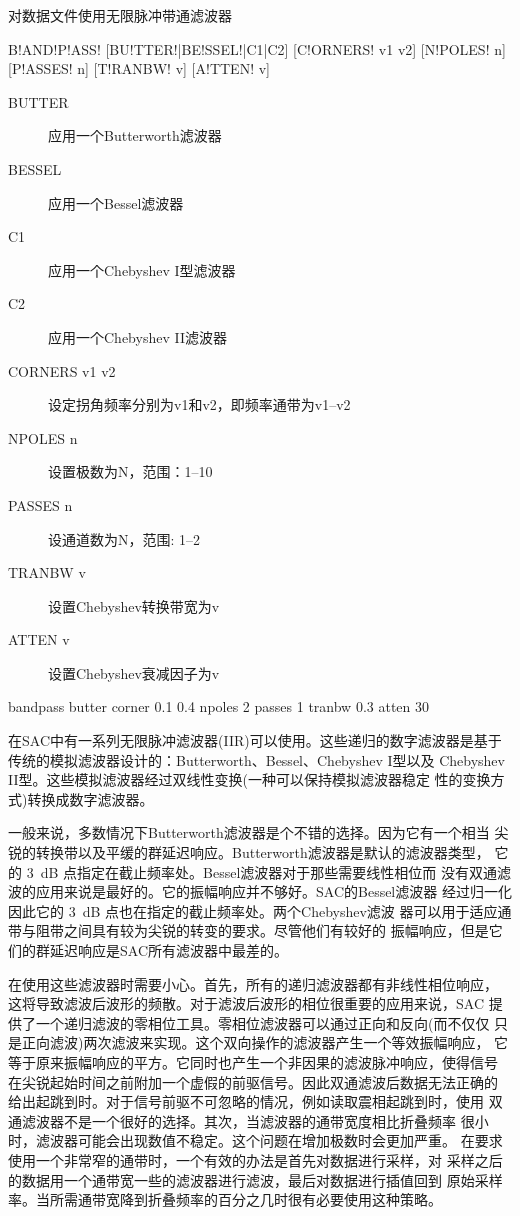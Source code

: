 \label{cmd:bandpass}

对数据文件使用无限脉冲带通滤波器

\begin{SACSTX}
B!AND!P!ASS! [BU!TTER!|BE!SSEL!|C1|C2] [C!ORNERS! v1 v2] [N!POLES! n] [P!ASSES! n]
    [T!RANBW! v] [A!TTEN! v]
\end{SACSTX}

\begin{description}
\item [BUTTER] 应用一个Butterworth滤波器
\item [BESSEL] 应用一个Bessel滤波器
\item [C1] 应用一个Chebyshev I型滤波器
\item [C2] 应用一个Chebyshev II滤波器
\item [CORNERS v1 v2] 设定拐角频率分别为v1和v2，即频率通带为v1--v2
\item [NPOLES n] 设置极数为N，范围：1--10
\item [PASSES n] 设通道数为N，范围: 1--2
\item [TRANBW v] 设置Chebyshev转换带宽为v
\item [ATTEN v] 设置Chebyshev衰减因子为v
\end{description}

\begin{SACDFT}
bandpass butter corner 0.1 0.4 npoles 2 passes 1 tranbw 0.3 atten 30
\end{SACDFT}

在SAC中有一系列无限脉冲滤波器(IIR)可以使用。这些递归的数字滤波器是基于
传统的模拟滤波器设计的：Butterworth、Bessel、Chebyshev I型以及
Chebyshev II型。这些模拟滤波器经过双线性变换(一种可以保持模拟滤波器稳定
性的变换方式)转换成数字滤波器。

一般来说，多数情况下Butterworth滤波器是个不错的选择。因为它有一个相当
尖锐的转换带以及平缓的群延迟响应。Butterworth滤波器是默认的滤波器类型，
它的 \SI{3}{dB} 点指定在截止频率处。Bessel滤波器对于那些需要线性相位而
没有双通滤波的应用来说是最好的。它的振幅响应并不够好。SAC的Bessel滤波器
经过归一化因此它的 \SI{3}{\dB} 点也在指定的截止频率处。两个Chebyshev滤波
器可以用于适应通带与阻带之间具有较为尖锐的转变的要求。尽管他们有较好的
振幅响应，但是它们的群延迟响应是SAC所有滤波器中最差的。

在使用这些滤波器时需要小心。首先，所有的递归滤波器都有非线性相位响应，
这将导致滤波后波形的频散。对于滤波后波形的相位很重要的应用来说，SAC
提供了一个递归滤波的零相位工具。零相位滤波器可以通过正向和反向(而不仅仅
只是正向滤波)两次滤波来实现。这个双向操作的滤波器产生一个等效振幅响应，
它等于原来振幅响应的平方。它同时也产生一个非因果的滤波脉冲响应，使得信号
在尖锐起始时间之前附加一个虚假的前驱信号。因此双通滤波后数据无法正确的
给出起跳到时。对于信号前驱不可忽略的情况，例如读取震相起跳到时，使用
双通滤波器不是一个很好的选择。其次，当滤波器的通带宽度相比折叠频率
很小时，滤波器可能会出现数值不稳定。这个问题在增加极数时会更加严重。
在要求使用一个非常窄的通带时，一个有效的办法是首先对数据进行采样，对
采样之后的数据用一个通带宽一些的滤波器进行滤波，最后对数据进行插值回到
原始采样率。当所需通带宽降到折叠频率的百分之几时很有必要使用这种策略。

